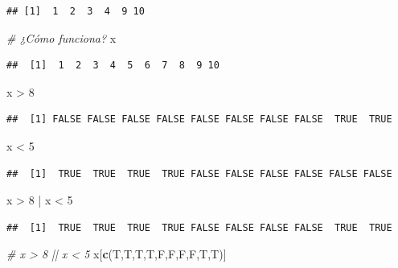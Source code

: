 \documentclass[]{article}
\newenvironment{Shaded}{\begin{snugshade}}{\end{snugshade}}
\newcommand{\KeywordTok}[1]{\textcolor[rgb]{0.13,0.29,0.53}{\textbf{{#1}}}}
\newcommand{\DecValTok}[1]{\textcolor[rgb]{0.00,0.00,0.81}{{#1}}}
\newcommand{\StringTok}[1]{\textcolor[rgb]{0.31,0.60,0.02}{{#1}}}
\newcommand{\CommentTok}[1]{\textcolor[rgb]{0.56,0.35,0.01}{\textit{{#1}}}}
\newcommand{\NormalTok}[1]{{#1}}
\begin{document}
\begin{verbatim}
## [1]  1  2  3  4  9 10
\end{verbatim}

\begin{Shaded}
\begin{Highlighting}[]
\CommentTok{# ¿Cómo funciona?}
\NormalTok{x}
\end{Highlighting}
\end{Shaded}

\begin{verbatim}
##  [1]  1  2  3  4  5  6  7  8  9 10
\end{verbatim}

\begin{Shaded}
\begin{Highlighting}[]
\NormalTok{x >}\StringTok{ }\DecValTok{8}
\end{Highlighting}
\end{Shaded}

\begin{verbatim}
##  [1] FALSE FALSE FALSE FALSE FALSE FALSE FALSE FALSE  TRUE  TRUE
\end{verbatim}

\begin{Shaded}
\begin{Highlighting}[]
\NormalTok{x <}\StringTok{ }\DecValTok{5}
\end{Highlighting}
\end{Shaded}

\begin{verbatim}
##  [1]  TRUE  TRUE  TRUE  TRUE FALSE FALSE FALSE FALSE FALSE FALSE
\end{verbatim}

\begin{Shaded}
\begin{Highlighting}[]
\NormalTok{x >}\StringTok{ }\DecValTok{8} \NormalTok{|}\StringTok{ }\NormalTok{x <}\StringTok{ }\DecValTok{5}
\end{Highlighting}
\end{Shaded}

\begin{verbatim}
##  [1]  TRUE  TRUE  TRUE  TRUE FALSE FALSE FALSE FALSE  TRUE  TRUE
\end{verbatim}

\begin{Shaded}
\begin{Highlighting}[]
\CommentTok{# x > 8 || x < 5}
\NormalTok{x[}\KeywordTok{c}\NormalTok{(T,T,T,T,F,F,F,F,T,T)]}
\end{Highlighting}
\end{Shaded}
\end{document}
